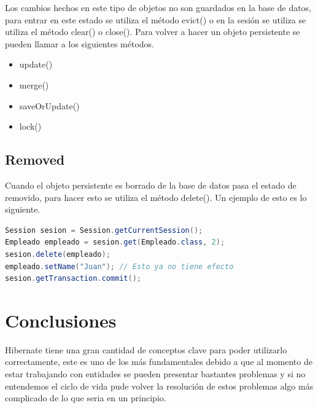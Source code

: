\documentclass[a4paper,12pt]{article}
\begin{document}
Los cambios hechos en este tipo de objetos no son guardados en la base de 
datos, para entrar en este estado se utiliza el método evict() o en la sesión 
se utiliza se utiliza el método clear() o close(). Para volver a hacer un 
objeto persistente se pueden llamar a los siguientes métodos.

\begin{itemize}
 \item update()
 \item merge()
 \item saveOrUpdate()
 \item lock()
\end{itemize}

\subsection{Removed}
Cuando el objeto persistente es borrado de la base de datos pasa el estado de 
removido, para hacer esto se utiliza el método delete(). Un ejemplo de esto es 
lo siguiente.

\begin{lstlisting}[language=Java,style=customJava,basicstyle=\fontfamily{cmss}
\small]
Session sesion = Session.getCurrentSession();
Empleado empleado = sesion.get(Empleado.class, 2);
sesion.delete(empleado);
empleado.setName("Juan"); // Esto ya no tiene efecto
sesion.getTransaction.commit();
\end{lstlisting}

\section{Conclusiones}
Hibernate tiene una gran cantidad de conceptos clave para poder utilizarlo 
correctamente, este es uno de los más fundamentales debido a que al momento de 
estar trabajando con entidades se pueden presentar bastantes problemas y si no 
entendemos el ciclo de vida pude volver la resolución de estos problemas algo 
más complicado de lo que seria en un principio.
\end{document}
